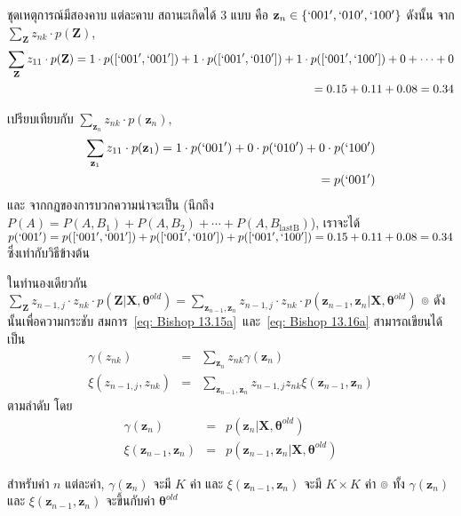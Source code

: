 ชุดเหตุการณ์มีสองคาบ แต่ละคาบ สถานะเกิดได้ 3 แบบ คือ $\textbf{z}_n \in \{ `001', `010', `100' \}$
ดังนั้น
จาก $\sum_{\textbf{Z}} z_{nk} \cdot p(\textbf{Z})$,
\begin{eqnarray}
\sum_{\textbf{Z}} z_{11} \cdot p(\textbf{Z}) = 1 \cdot p([`001',`001']) + 1 \cdot p([`001',`010']) + 1 \cdot p([`001',`100']) 
+ 0 + \cdots + 0
\nonumber \\
=
0.15 + 0.11 + 0.08 = 0.34
\nonumber
\end{eqnarray}

เปรียบเทียบกับ
$\sum_{\textbf{z}_n} z_{nk} \cdot p(\textbf{z}_n)$,
\begin{eqnarray}
\sum_{\textbf{z}_1} z_{11} \cdot p(\textbf{z}_1) = 1 \cdot p(`001') + 0 \cdot p(`010') + 0 \cdot p(`100') 
\nonumber \\
= p(`001')
\nonumber
\end{eqnarray}
และ จากกฏของการบวกความน่าจะเป็น (นึกถึง $P(A) = P(A,B_1) + P(A,B_2) + \cdots + P(A,B_{\mathrm{last B}})$), เราจะได้
$p(`001') = p([`001', `001']) + p([`001', `010']) + p([`001', `100']) = 0.15 + 0.11 + 0.08 = 0.34$ ซึ่งเท่ากับวิธีข้างต้น

ในทำนองเดียวกัน $\sum_{\textbf{Z}} z_{n-1,j} \cdot z_{nk} \cdot p(\textbf{Z}| \textbf{X}, \bm{\theta}^{old}) = \sum_{\textbf{z}_{n-1}, \textbf{z}_n} z_{n-1,j} \cdot z_{nk} \cdot p(\textbf{z}_{n-1}, \textbf{z}_n| \textbf{X}, \bm{\theta}^{old})$
๏ ดังนั้นเพื่อความกระชับ สมการ~\ref{eq: Bishop 13.15a}~และ~\ref{eq: Bishop 13.16a} สามารถเขียนได้เป็น
\begin{eqnarray}
\gamma ( z_{nk} ) &=& \sum_{\textbf{z}_n} z_{nk} \gamma (\textbf{z}_n)
\label{eq: Bishop 13.15} \\
\xi (z_{n-1,j}, z_{nk}) &=& \sum_{\textbf{z}_{n-1}, \textbf{z}_n} z_{n-1,j} z_{nk} \xi (\textbf{z}_{n-1}, \textbf{z}_n) 
\label{eq: Bishop 13.16}
\end{eqnarray}
ตามลำดับ โดย
\begin{eqnarray}
\gamma (\textbf{z}_n) &=& p(\textbf{z}_n | \textbf{X}, \bm{\theta}^{old})
\label{eq: Bishop 13.13} \\
\xi (\textbf{z}_{n-1}, \textbf{z}_n) &=& p(\textbf{z}_{n-1}, \textbf{z}_n | \textbf{X}, \bm{\theta}^{old})
\label{eq: Bishop 13.14}
\end{eqnarray}

สำหรับค่า $n$ แต่ละค่า, $\gamma (\textbf{z}_n)$ จะมี $K$ ค่า
และ
$\xi (\textbf{z}_{n-1}, \textbf{z}_n)$ จะมี $K \times K$ ค่า
๏ ทั้ง $\gamma (\textbf{z}_n)$ และ $\xi (\textbf{z}_{n-1}, \textbf{z}_n)$ จะขึ้นกับค่า $\bm{\theta}^{old}$

